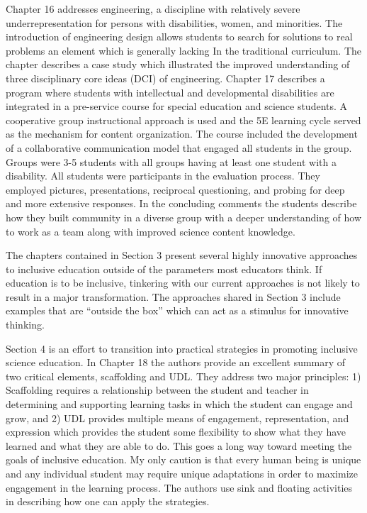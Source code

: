 \documentclass[11.5pt]{sig-alternate} %
\begin{document}
\begin{large}
Chapter 16 addresses engineering, a discipline with relatively severe underrepresentation for persons with disabilities, women, and minorities.  The introduction  of engineering design allows students to search for solutions to real problems an element which is generally lacking In the traditional curriculum.  The chapter describes a case study which illustrated the improved understanding of three disciplinary core ideas (DCI) of engineering. Chapter  17 describes a program where students with intellectual and developmental disabilities are integrated in a pre-service course for special education and science students. A cooperative group instructional approach is used and the 5E learning cycle served as the mechanism for content organization.  The course included the development of a collaborative communication model that engaged all students in the group.  Groups were 3-5 students with all groups having at least one student with a disability.  All students were participants in the evaluation process.  They employed pictures, presentations, reciprocal questioning, and probing for deep and more extensive responses. In the concluding comments the students describe how they built community in a diverse group with a deeper understanding of how to work as a team along with improved science content knowledge.

The chapters contained in Section 3 present several highly innovative approaches to inclusive education outside of the parameters most educators think.  If education is to be inclusive, tinkering with our current approaches is not likely to result in a major transformation.  The approaches shared in Section 3 include examples that are “outside the box” which can act as a stimulus for innovative thinking.

Section 4 is an effort to transition into practical strategies in promoting inclusive science education.  In Chapter 18 the authors provide an excellent summary of two critical elements, scaffolding and UDL. They address two major principles: 1) Scaffolding requires a relationship between the student and teacher in determining and supporting learning tasks in which the student can engage and grow, and 2) UDL provides multiple means of engagement, representation, and expression which provides the student some flexibility to show what they have learned and what they are able to do.  This goes a long way toward meeting the goals of inclusive education.  My only caution is that every human being is unique and any individual student may require unique adaptations in order to maximize engagement in the learning process. The authors use sink and floating activities in describing how one can apply the strategies.


\end{large}
\end{document}
